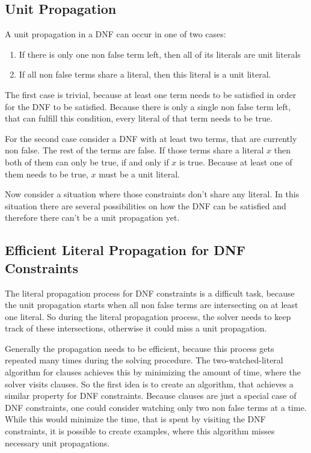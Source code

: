 \subsection{Unit Propagation}
A unit propagation in a DNF can occur in one of two cases:
\begin{leftbar}
\begin{enumerate}
\item If there is only one non false term left, then all of its literals are unit literals
\item If all non false terms share a literal, then this literal is a unit literal.
\end{enumerate}
\end{leftbar}
The first case is trivial, because at least one term needs to be satisfied in order for the DNF to be satisfied. Because there is only a single non false term left, that can fulfill this condition, every literal of that term needs to be true.
\par
For the second case consider a DNF with at least two terms, that are currently non false. The rest of the terms are false. If those terms share a literal $x$ then both of them can only be true, if and only if $x$ is true. Because at least one of them needs to be true, $x$ must be a unit literal.
\par
Now consider a situation where those constraints don't share any literal. In this situation there are several possibilities on how the DNF can be satisfied and therefore there can't  be a unit propagation yet.

\subsection{Efficient Literal Propagation for DNF Constraints}

The literal propagation process for DNF constraints is a difficult task, because the unit propagation starts when all non false terms are intersecting on at least one literal. So during the literal propagation process, the solver needs to keep track of these intersections, otherwise it could miss a unit propagation. 

Generally the propagation needs to be efficient, because this process gets repeated many times during the solving procedure. The two-watched-literal algorithm for clauses achieves this by minimizing the amount of time, where the solver visits clauses. So the first idea is to create an algorithm, that achieves a similar property for DNF constraints. Because clauses are just a special case of DNF constraints, one could consider watching only two non false terms at a time. While this would minimize the time, that is spent by visiting the DNF constraints, it is possible to create examples, where this algorithm misses necessary unit propagations.

